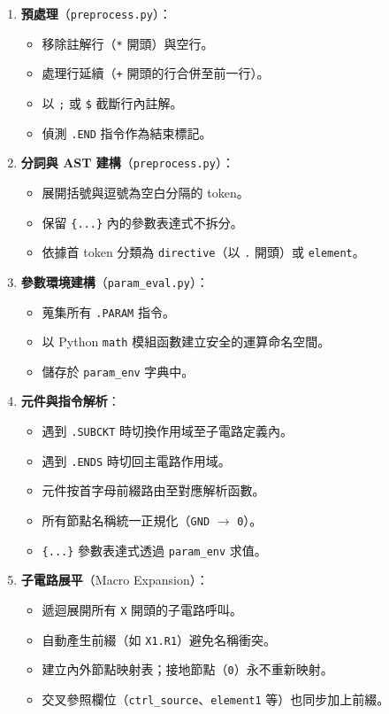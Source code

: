 \documentclass[12pt,a4paper]{article}
\begin{document}
\begin{enumerate}
  \item \textbf{預處理}（\texttt{preprocess.py}）：
    \begin{itemize}
      \item 移除註解行（\texttt{*} 開頭）與空行。
      \item 處理行延續（\texttt{+} 開頭的行合併至前一行）。
      \item 以 \texttt{;} 或 \texttt{\$} 截斷行內註解。
      \item 偵測 \texttt{.END} 指令作為結束標記。
    \end{itemize}

  \item \textbf{分詞與 AST 建構}（\texttt{preprocess.py}）：
    \begin{itemize}
      \item 展開括號與逗號為空白分隔的 token。
      \item 保留 \texttt{\{...\}} 內的參數表達式不拆分。
      \item 依據首 token 分類為 \texttt{directive}（以 \texttt{.} 開頭）或 \texttt{element}。
    \end{itemize}

  \item \textbf{參數環境建構}（\texttt{param\_eval.py}）：
    \begin{itemize}
      \item 蒐集所有 \texttt{.PARAM} 指令。
      \item 以 Python \texttt{math} 模組函數建立安全的運算命名空間。
      \item 儲存於 \texttt{param\_env} 字典中。
    \end{itemize}

  \item \textbf{元件與指令解析}：
    \begin{itemize}
      \item 遇到 \texttt{.SUBCKT} 時切換作用域至子電路定義內。
      \item 遇到 \texttt{.ENDS} 時切回主電路作用域。
      \item 元件按首字母前綴路由至對應解析函數。
      \item 所有節點名稱統一正規化（\texttt{GND} $\rightarrow$ \texttt{0}）。
      \item \texttt{\{...\}} 參數表達式透過 \texttt{param\_env} 求值。
    \end{itemize}

  \item \textbf{子電路展平}（Macro Expansion）：
    \begin{itemize}
      \item 遞迴展開所有 \texttt{X} 開頭的子電路呼叫。
      \item 自動產生前綴（如 \texttt{X1.R1}）避免名稱衝突。
      \item 建立內外節點映射表；接地節點（\texttt{0}）永不重新映射。
      \item 交叉參照欄位（\texttt{ctrl\_source}、\texttt{element1} 等）也同步加上前綴。
    \end{itemize}


\end{enumerate}
\end{document}
